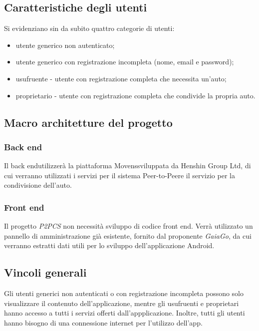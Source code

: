 \subsection{Caratteristiche degli utenti}
Si evidenziano sin da subito quattro categorie di utenti:
\begin{itemize}
	\item utente generico non autenticato;
	\item utente generico con registrazione incompleta (nome, email e password);
	\item usufruente - utente con registrazione completa che necessita un'auto;
	\item proprietario - utente con registrazione completa che condivide la propria auto.
\end{itemize}

\subsection{Macro architetture del progetto}
\subsubsection{Back end}
Il back end\glosp utilizzerà la piattaforma Movens\glosp sviluppata da Henshin Group Ltd, di cui verranno utilizzati i servizi per il sistema Peer-to-Peer\glosp e il servizio per la condivisione dell'auto. 

\subsubsection{Front end}
Il progetto \textit{P2PCS} non necessità sviluppo di codice front end\glo.
Verrà utilizzato un pannello di amministrazione già esistente, fornito dal proponente \textit{GaiaGo}, da cui verranno estratti dati utili per lo sviluppo dell'applicazione Android.

\subsection{Vincoli generali}
Gli utenti generici non autenticati o con registrazione incompleta possono solo visualizzare il contenuto dell'applicazione, mentre gli usufruenti e proprietari hanno accesso a tutti i servizi offerti dall'appplicazione. Inoltre, tutti gli utenti hanno bisogno di una connessione internet per l'utilizzo dell'app.

 

